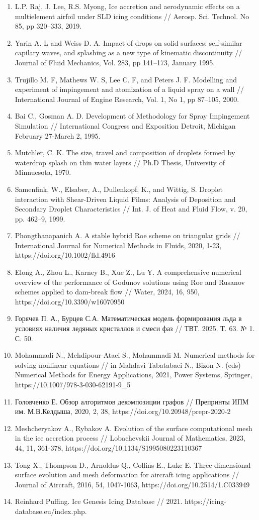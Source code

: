 \documentclass{psta}%
\begin{document}
\begin{enumerate}
\item L.P. Raj, J. Lee, R.S. Myong, Ice accretion and aerodynamic effects on a multielement airfoil under SLD icing conditions // Aerosp. Sci. Technol. No 85,  pp 320–333, 2019.
\item Yarin A. L and Weiss D. A. Impact of drops on solid surfaces: self-similar capilary waves, and splashing as a new type of kinematic discontinuity // Journal of Fluid Mechanics, Vol. 283, pp 141–173, January 1995.
\item Trujillo M. F, Mathews W. S, Lee C. F, and Peters J. F. Modelling and experiment of impingement and atomization of a liquid spray on a wall // International Journal of Engine Research, Vol. 1, No 1, pp 87–105, 2000.
\item Bai C., Gosman A. D. Development of Methodology for Spray Impingement Simulation // International Congress and Exposition Detroit, Michigan February 27-March 2, 1995.
\item Mutchler, C. K. The size, travel and composition of droplets formed by waterdrop splash on thin water layers // Ph.D Thesis, University of Minnuesota, 1970.
\item Samenfink, W., Elsaber, A., Dullenkopf, K., and Wittig, S. Droplet interaction with Shear-Driven Liquid Films: Analysis of Deposition and Secondary Droplet Characteristics // Int. J. of Heat and Fluid Flow, v. 20, pp. 462–9, 1999.
\item Phongthanapanich A. A stable hybrid Roe scheme on triangular grids // International Journal for Numerical Methods in Fluids, 2020, 1-23, https://doi.org/10.1002/fld.4916
\item Elong A., Zhou L., Karney B., Xue Z., Lu Y. A comprehensive numerical overview of the performance of Godunov solutions using Roe and Rusanov schemes applied to dam-break flow // Water, 2024, 16, 950, https://doi.org/10.3390/w16070950
\item Горячев П. А., Бурцев С.А. Математическая модель формирования льда в условиях наличия ледяных кристаллов и смеси фаз // ТВТ. 2025. Т. 63. № 1. С. 50.
\item Mohammadi N., Mehdipour-Ataei S., Mohammadi M. Numerical methods for solving nonlinear equations // in Mahdavi Tabatabaei N., Bizon N. (eds) Numerical Methods for Energy Applications, 2021, Power Systems, Springer, https://10.1007/978-3-030-62191-9\_5
\item Головченко Е. Обзор алгоритмов декомпозиции графов // Препринты ИПМ им. М.В.Келдыша, 2020, 2, 38, https://doi.org/10.20948/prepr-2020-2
\item Meshcheryakov A., Rybakov A. Evolution of the surface computational mesh in the ice accretion process // Lobachevskii Journal of Mathematics, 2023, 44, 11, 361-378, https://doi.org/10.1134/S1995080223110367
\item Tong X., Thompson D., Arnoldus Q., Collins E., Luke E. Three-dimensional surface evolution and mesh deformation for aircraft icing applications // Journal of Aircraft, 2016, 54, 1047-1063, https://doi.org/10.2514/1.C033949
\item Reinhard Puffing. Ice Genesis Icing Database // 2021. https://icing-database.eu/index.php.
\end{enumerate}
\end{document}
